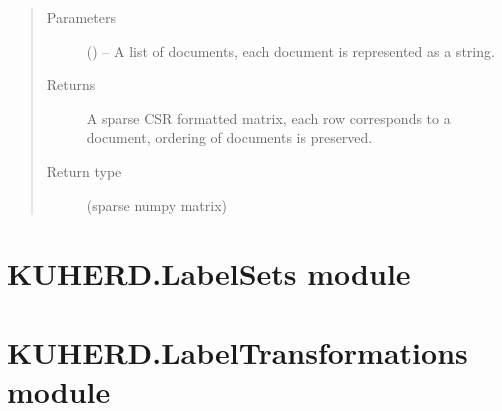 \documentclass[letterpaper,10pt,english]{sphinxmanual}
\begin{document}
\begin{fulllineitems}
\begin{fulllineitems}
\begin{description}
\end{description}
\begin{quote}\begin{description}
\item[{Parameters}] \leavevmode
{} () -- A list of documents, each document is represented as a string.

\item[{Returns}] \leavevmode
A sparse CSR formatted matrix, each row corresponds to a document, ordering of documents is preserved.

\item[{Return type}] \leavevmode
(sparse numpy matrix)

\end{description}\end{quote}

\end{fulllineitems}


\end{fulllineitems}


\begin{fulllineitems}
\label{\detokenize{KUHERD:KUHERD.HerdVectorizer.main}}
\end{fulllineitems}



\section{KUHERD.LabelSets module}
\label{\detokenize{KUHERD:kuherd-labelsets-module}}\label{\detokenize{KUHERD:module-KUHERD.LabelSets}}

\section{KUHERD.LabelTransformations module}
\label{\detokenize{KUHERD:kuherd-labeltransformations-module}}\label{\detokenize{KUHERD:module-KUHERD.LabelTransformations}}
\end{document}
